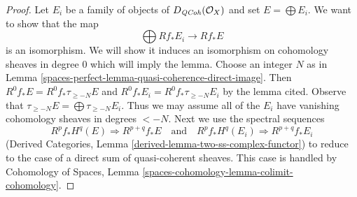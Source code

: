 \begin{proof}
Let $E_i$ be a family of objects of $D_{\mathit{QCoh}}(\mathcal{O}_X)$
and set $E = \bigoplus E_i$. We want to show that the map
$$
\bigoplus Rf_*E_i \longrightarrow Rf_*E
$$
is an isomorphism. We will show it induces an isomorphism on
cohomology sheaves in degree $0$ which will imply the lemma.
Choose an integer $N$ as in Lemma \ref{spaces-perfect-lemma-quasi-coherence-direct-image}.
Then $R^0f_*E = R^0f_*\tau_{\geq -N}E$ and
$R^0f_*E_i = R^0f_*\tau_{\geq -N}E_i$ by the lemma cited. Observe that
$\tau_{\geq -N}E = \bigoplus \tau_{\geq -N}E_i$.
Thus we may assume all of the $E_i$ have vanishing cohomology
sheaves in degrees $< -N$. Next we use the spectral sequences
$$
R^pf_*H^q(E) \Rightarrow R^{p + q}f_*E
\quad\text{and}\quad
R^pf_*H^q(E_i) \Rightarrow R^{p + q}f_*E_i
$$
(Derived Categories, Lemma \ref{derived-lemma-two-ss-complex-functor})
to reduce to the case of a direct sum of quasi-coherent sheaves.
This case is handled by
Cohomology of Spaces, Lemma \ref{spaces-cohomology-lemma-colimit-cohomology}.
\end{proof}

